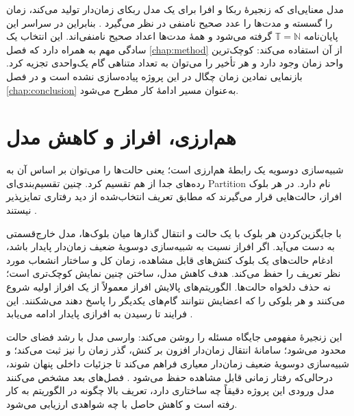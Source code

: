 مدل معنایی‌ای که زنجیرهٔ ربکا و افرا برای یک مدل ربکای زمان‌دار تولید می‌کند، زمان را گسسته و مدت‌ها را عدد صحیح نامنفی در نظر می‌گیرد \cite{ReynissonEtAl2014TimedRebeca}. بنابراین در سراسر این پایان‌نامه $\mathbb{T}=\mathbb{N}$ گرفته می‌شود و همهٔ مدت‌ها اعداد صحیح نامنفی‌اند. این انتخاب یک سادگی مهم به همراه دارد که فصل \ref{chap:method} از آن استفاده می‌کند: کوچک‌ترین واحد زمان وجود دارد و هر تأخیر را می‌توان به تعداد متناهی گام یک‌واحدی تجزیه کرد. بازنمایی نمادین زمان چگال در این پروژه پیاده‌سازی نشده است و در فصل \ref{chap:conclusion} به‌عنوان مسیر ادامهٔ کار مطرح می‌شود.

\section{هم‌ارزی، افراز و کاهش مدل}

شبیه‌سازی دوسویه یک رابطهٔ هم‌ارزی است؛ یعنی حالت‌ها را می‌توان بر اساس آن به رده‌های جدا از هم تقسیم کرد. چنین تقسیم‌بندی‌ای \gls{Partition} نام دارد. در هر بلوک افراز، حالت‌هایی قرار می‌گیرند که مطابق تعریف انتخاب‌شده از دید رفتاری تمایزپذیر نیستند \cite{BaierKatoen2008,GlabbeekWeijland1996}.

با جایگزین‌کردن هر بلوک با یک حالت و انتقال گذارها میان بلوک‌ها، مدل خارج‌قسمتی به دست می‌آید. اگر افراز نسبت به شبیه‌سازی دوسویهٔ ضعیف زمان‌دار پایدار باشد، ادغام حالت‌های یک بلوک کنش‌های قابل مشاهده، زمان کل و ساختار انشعاب مورد نظر تعریف را حفظ می‌کند. هدف کاهش مدل، ساختن چنین نمایش کوچک‌تری است؛ نه حذف دلخواه حالت‌ها. الگوریتم‌های پالایش افراز معمولاً از یک افراز اولیه شروع می‌کنند و هر بلوکی را که اعضایش نتوانند گام‌های یکدیگر را پاسخ دهند می‌شکنند. این فرایند تا رسیدن به افرازی پایدار ادامه می‌یابد \cite{PaigeTarjan1987,GrooteVaandrager1990,BaierKatoen2008}.

این زنجیرهٔ مفهومی جایگاه مسئله را روشن می‌کند: وارسی مدل با رشد فضای حالت محدود می‌شود؛ سامانهٔ انتقال زمان‌دار افزون بر کنش، گذر زمان را نیز ثبت می‌کند؛ و شبیه‌سازی دوسویهٔ ضعیف زمان‌دار معیاری فراهم می‌کند تا جزئیات داخلی پنهان شوند، درحالی‌که رفتار زمانی قابل مشاهده حفظ می‌شود \cite{BaierKatoen2008,BerardEtAl2008,ReynierSangnier2009}. فصل‌های بعد مشخص می‌کنند مدل ورودی این پروژه دقیقاً چه ساختاری دارد، تعریف بالا چگونه در الگوریتم به کار رفته است و کاهش حاصل با چه شواهدی ارزیابی می‌شود.
